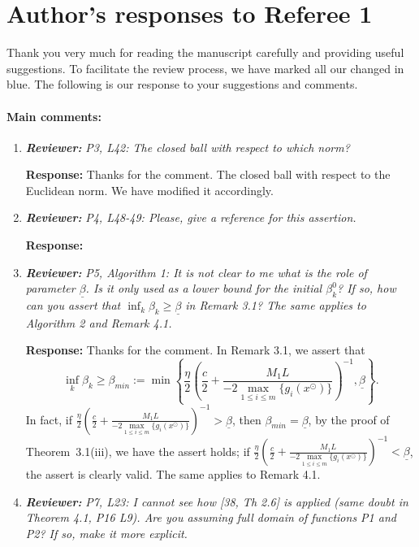 \documentclass{article}
\begin{document}
\section*{Author's responses to Referee 1}
Thank you very much for reading the manuscript carefully and providing useful suggestions. To facilitate the review process, we have marked all our changed in blue.  The following is our response to your suggestions and comments.

\paragraph{Main comments:}
\begin{enumerate}
	\item  \textit{\textbf{Reviewer:}} \textit{P3, L42: The closed ball with respect to which norm?}
	
	\textbf{Response:} Thanks for the comment. The closed ball with respect to the Euclidean norm. We have modified it accordingly.

	\item  \textit{\textbf{Reviewer:}} \textit{P4, L48-49: Please, give a reference for this assertion.}
	
	\textbf{Response:} {\color{red}{Unanswered.}}

	\item  \textit{\textbf{Reviewer:}} \textit{P5, Algorithm 1: It is not clear to me what is the role of parameter $\underline{\beta}$. Is it only used as a lower bound for the initial $\beta_k^0$? If so, how can you assert that $\inf_k \beta_k \ge \underline{\beta}$ in Remark 3.1? The same applies to Algorithm 2 and Remark 4.1.}
	
	\textbf{Response:} Thanks for the comment. In Remark 3.1, we assert that
\[\inf_k \beta_k \ge \beta_{min}:= \textstyle\min\left\{\frac{\eta}{2}\left(\frac{c}2 + \frac{M_1L}{-2\max\limits_{1 \le i \le m}\{g_i(x^\odot)\}}\right)^{-1},\underline{\beta}\right\}.\]
In fact, if $\frac{\eta}{2}\left(\frac{c}2 + \frac{M_1L}{-2\max\limits_{1 \le i \le m}\{g_i(x^\odot)\}}\right)^{-1} > \underline{\beta}$, then $\beta_{min} = \underline{\beta}$, by the proof of Theorem~3.1(iii), we have the assert holds; if $\frac{\eta}{2}\left(\frac{c}2 + \frac{M_1L}{-2\max\limits_{1 \le i \le m}\{g_i(x^\odot)\}}\right)^{-1} < \underline{\beta}$, the assert is clearly valid. The same applies to Remark 4.1.

	\item  \textit{\textbf{Reviewer:}} \textit{P7, L23: I cannot see how [38, Th 2.6] is applied (same doubt in Theorem 4.1, P16 L9). Are you assuming full domain of functions P1 and P2? If so, make it more explicit.}
	

\end{enumerate}
\end{document}
